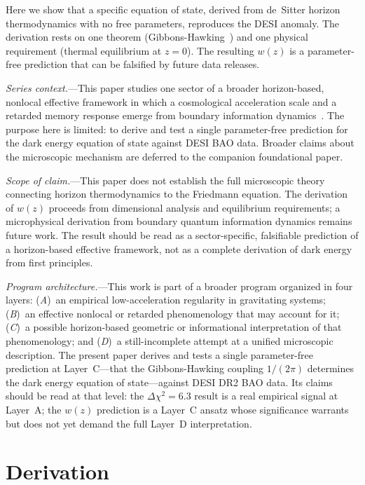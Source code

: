 \documentclass[aps,prl,twocolumn,showpacs,preprintnumbers,amsmath,amssymb,superscriptaddress]{revtex4-2}
\begin{document}
Here we show that a specific equation of state, derived from de~Sitter 
horizon thermodynamics with no free parameters, reproduces the DESI 
anomaly. The derivation rests on one theorem (Gibbons-Hawking~\cite{GH1977}) 
and one physical requirement (thermal equilibrium at $z=0$). The resulting 
$w(z)$ is a parameter-free prediction that can be falsified by future 
data releases.

\textit{Series context.}---This paper studies one sector of a broader 
horizon-based, nonlocal effective framework in which a cosmological 
acceleration scale and a retarded memory response emerge from boundary 
information dynamics~\cite{PaperA}. The purpose here is limited: to derive 
and test a single parameter-free prediction for the dark energy equation 
of state against DESI BAO data. Broader claims about the microscopic 
mechanism are deferred to the companion foundational paper.

\textit{Scope of claim.}---This paper does not establish the full 
microscopic theory connecting horizon thermodynamics to the Friedmann 
equation. The derivation of $w(z)$ proceeds from dimensional analysis 
and equilibrium requirements; a microphysical derivation from boundary 
quantum information dynamics remains future work. The result should be 
read as a sector-specific, falsifiable prediction of a horizon-based 
effective framework, not as a complete derivation of dark energy from 
first principles.

\textit{Program architecture.}---This work is part of a broader program 
organized in four layers: (\emph{A})~an empirical low-acceleration 
regularity in gravitating systems; (\emph{B})~an effective nonlocal or 
retarded phenomenology that may account for it; (\emph{C})~a possible 
horizon-based geometric or informational interpretation of that 
phenomenology; and (\emph{D})~a still-incomplete attempt at a unified 
microscopic description. The present paper derives and tests a single 
parameter-free prediction at Layer~C---that the Gibbons-Hawking coupling 
$1/(2\pi)$ determines the dark energy equation of state---against DESI 
DR2 BAO data. Its claims should be read at that level: the $\Delta\chi^2 
= 6.3$ result is a real empirical signal at Layer~A; the $w(z)$ 
prediction is a Layer~C ansatz whose significance warrants but does not 
yet demand the full Layer~D interpretation.

\section{Derivation}
\end{document}
